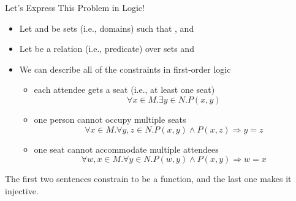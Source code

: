 \documentclass{beamer}
\begin{document}
\begin{frame}{Let's Express This Problem in Logic!}
  \begin{itemize}
  \item Let  and  be sets (i.e., \alert{domains}) such that , and 
  \item Let  be a relation (i.e., \alert{predicate}) over sets  and 
  \item We can describe all of the constraints in first-order logic
    \begin{itemize}
    \item \pause each attendee gets a seat (i.e., at least one seat)
      \[
      \forall x \in M. \exists y \in N. P(x, y)
      \]
    \item \pause one person cannot occupy multiple seats
      \[
      \forall x \in M. \forall y, z \in N. P(x, y) \land P(x, z) \Rightarrow y=z
      \]
    \item \pause one seat cannot accommodate multiple attendees
      \[
      \forall w, x \in M. \forall y \in N. P(w, y) \land P(x, y) \Rightarrow w=x
      \]
    \end{itemize}
  \end{itemize}
  \pause
  The first two sentences constrain  to be a function, and the last one makes it injective.
\end{frame}
\end{document}
